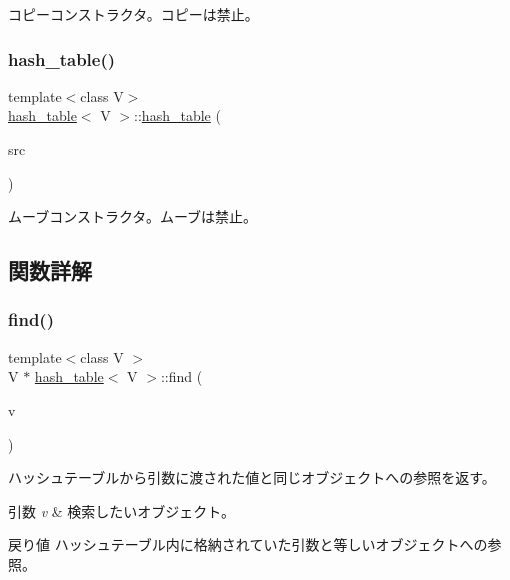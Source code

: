 コピーコンストラクタ。コピーは禁止。 \hypertarget{classhash__table_a9c397149a5b8e6766ada4b23ec7344de}{}\label{classhash__table_a9c397149a5b8e6766ada4b23ec7344de} 
\subsubsection{\texorpdfstring{hash\+\_\+table()}{hash\_table()}\hspace{0.1cm}{\footnotesize\ttfamily [4/4]}}
{\footnotesize\ttfamily template$<$class V$>$ \\
\hyperlink{classhash__table}{hash\+\_\+table}$<$ V $>$\+::\hyperlink{classhash__table}{hash\+\_\+table} (\begin{DoxyParamCaption}\item[{const \hyperlink{classhash__table}{hash\+\_\+table}$<$ V $>$ \&\&}]{src }\end{DoxyParamCaption})\hspace{0.3cm}{\ttfamily [delete]}}

ムーブコンストラクタ。ムーブは禁止。 

\subsection{関数詳解}
\hypertarget{classhash__table_ae6968f84ffa245688a2fd8eebb86e7a6}{}\label{classhash__table_ae6968f84ffa245688a2fd8eebb86e7a6} 
\subsubsection{\texorpdfstring{find()}{find()}}
{\footnotesize\ttfamily template$<$class V $>$ \\
V $\ast$ \hyperlink{classhash__table}{hash\+\_\+table}$<$ V $>$\+::find (\begin{DoxyParamCaption}\item[{const V \&}]{v }\end{DoxyParamCaption})}

ハッシュテーブルから引数に渡された値と同じオブジェクトへの参照を返す。 
\begin{DoxyParams}{引数}
{\em v} & 検索したいオブジェクト。 \\
\hline
\end{DoxyParams}
\begin{DoxyReturn}{戻り値}
ハッシュテーブル内に格納されていた引数と等しいオブジェクトへの参照。 
\end{DoxyReturn}
\hypertarget{classhash__table_a9e02312051be1517ad16ee8164af07dd}{}\label{classhash__table_a9e02312051be1517ad16ee8164af07dd} 

